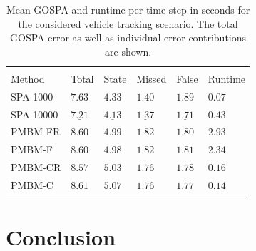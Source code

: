 \documentclass[10pt, twoside, romanappendices]{IEEEtran}
\begin{document}
\begin{table}
\vspace{1mm}
\centering
\begin{small}
\hspace{-.5mm}\begin{tabular}{  C{1.5cm} | C{.85cm} |  C{.85cm} |  C{.85cm} |  C{.85cm}  |  C{.85cm}  }
\hline\\[-3.4mm]
{\rule{0mm}{3.8mm} Method}&{Total}&{State}&{Missed}&{False}&{Runtime}\\[1mm]
\hline

 SPA-1000 & $7.63$ & $4.33$ &  $1.40$& $1.89$ & \underline{$0.07$} \rule{0mm}{3.3mm} \\[1mm]

SPA-10000 & $\underline{7.21}$  & $\underline{4.13}$ & $\underline{1.37}$& $\underline{1.71}$& $0.43$ \rule{0mm}{3.3mm} \\[1mm]

 PMBM-FR & $8.60$ & $4.99$ & $1.82$ & $1.80$ & $2.93$  \rule{0mm}{3.3mm} \\[1mm]

 PMBM-F & $8.60$& $4.98$ &  $1.82$ &  $1.81$ & $2.34$  \rule{0mm}{3.3mm} \\[1mm]

 PMBM-CR & $8.57$& $5.03$ &  $1.76$ &  $1.78$ & $0.16$ \rule{0mm}{3.3mm} \\[1mm]

PMBM-C & $8.61$  & $5.07$ &  $1.76$&$1.77$& $0.14$ \rule{0mm}{3.3mm} \\[1mm]

\hline
\end{tabular}
\end{small}
\vspace{2.5mm}
\caption{Mean GOSPA and runtime per time step in seconds for the considered vehicle tracking scenario. The total GOSPA error as well as individual error contributions are shown.} 
\label{fig:table2}
\end{table}


\section{Conclusion}
\end{document}
